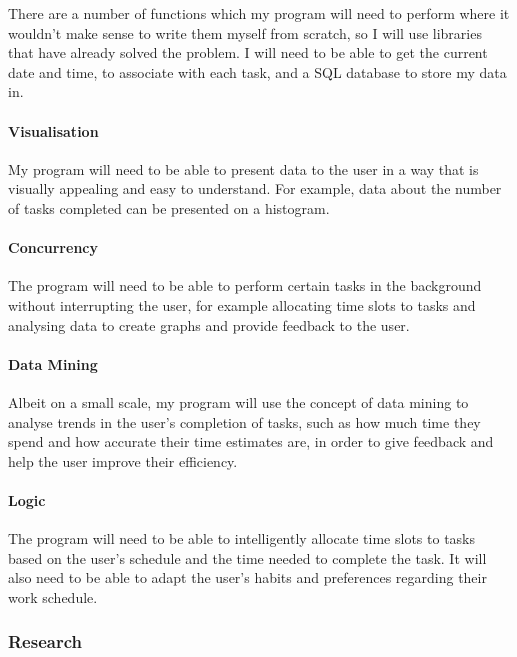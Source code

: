 \documentclass[]{article}
\let\oldparagraph\paragraph
\renewcommand{\paragraph}[1]{\oldparagraph{#1}\mbox{}}
\begin{document}
There are a number of functions which my program will need to perform
where it wouldn't make sense to write them myself from scratch, so I
will use libraries that have already solved the problem. I will need to
be able to get the current date and time, to associate with each task,
and a SQL database to store my data in.

\hypertarget{visualisation}{%
\paragraph{Visualisation}\label{visualisation}}

My program will need to be able to present data to the user in a way
that is visually appealing and easy to understand. For example, data
about the number of tasks completed can be presented on a histogram.

\hypertarget{concurrency}{%
\paragraph{Concurrency}\label{concurrency}}

The program will need to be able to perform certain tasks in the
background without interrupting the user, for example allocating time
slots to tasks and analysing data to create graphs and provide feedback
to the user.

\hypertarget{data-mining}{%
\paragraph{Data Mining}\label{data-mining}}

Albeit on a small scale, my program will use the concept of data mining
to analyse trends in the user's completion of tasks, such as how much
time they spend and how accurate their time estimates are, in order to
give feedback and help the user improve their efficiency.

\hypertarget{logic}{%
\paragraph{Logic}\label{logic}}

The program will need to be able to intelligently allocate time slots to
tasks based on the user's schedule and the time needed to complete the
task. It will also need to be able to adapt the user's habits and
preferences regarding their work schedule.

\hypertarget{research}{%
\subsubsection{Research}\label{research}}
\end{document}
